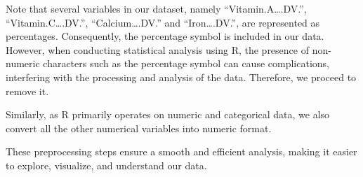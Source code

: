 \documentclass[
]{article}
\begin{document}
Note that several variables in our dataset, namely
``Vitamin.A\ldots.DV.'', ``Vitamin.C\ldots.DV.'', ``Calcium\ldots.DV.''
and ``Iron\ldots.DV.'', are represented as percentages. Consequently,
the percentage symbol is included in our data. However, when conducting
statistical analysis using R, the presence of non-numeric characters
such as the percentage symbol can cause complications, interfering with
the processing and analysis of the data. Therefore, we proceed to remove
it.

Similarly, as R primarily operates on numeric and categorical data, we
also convert all the other numerical variables into numeric format.

These preprocessing steps ensure a smooth and efficient analysis, making
it easier to explore, visualize, and understand our data.
\end{document}
